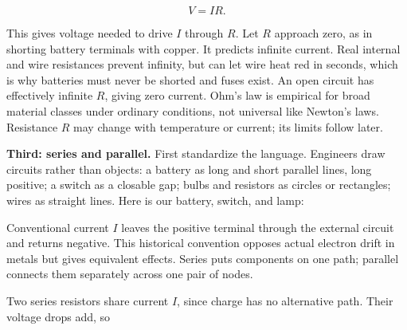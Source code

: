 \[
V=IR.
\]

This gives voltage needed to drive \(I\) through \(R\). Let \(R\) approach zero, as in shorting battery terminals with copper. It predicts infinite current. Real internal and wire resistances prevent infinity, but can let wire heat red in seconds, which is why batteries must never be shorted and fuses exist. An open circuit has effectively infinite \(R\), giving zero current. Ohm's law is empirical for broad material classes under ordinary conditions, not universal like Newton's laws. Resistance \(R\) may change with temperature or current; its limits follow later.

\textbf{Third: series and parallel.} First standardize the language. Engineers draw circuits rather than objects: a battery as long and short parallel lines, long positive; a switch as a closable gap; bulbs and resistors as circles or rectangles; wires as straight lines. Here is our battery, switch, and lamp:

\begin{center}
\end{center}

Conventional current \(I\) leaves the positive terminal through the external circuit and returns negative. This historical convention opposes actual electron drift in metals but gives equivalent effects. Series puts components on one path; parallel connects them separately across one pair of nodes.

Two series resistors share current \(I\), since charge has no alternative path. Their voltage drops add, so

